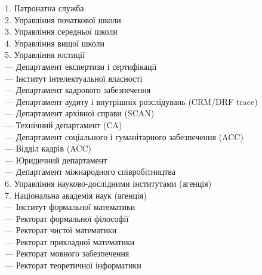 1. Патронатна служба \\
2. Управління початкової школи \\
3. Управління середньої школи \\
4. Управління вищої школи \\
5. Управління юстиції \\
\hspace{2cm}     — Департамент експертизи і сертифікації \\
\hspace{2cm}     — Інститут інтелектуальної власності \\
\hspace{2cm}     — Департамент кадрового забезпечення \\
\hspace{2cm}     — Департамент аудиту і внутрішніх розслідувань (CRM/DRF trace) \\
\hspace{2cm}     — Департамент архівної справи (SCAN) \\
\hspace{2cm}     — Технічний департамент (CA) \\
\hspace{2cm}     — Департамент соціального і гуманітарного забезпечення (ACC) \\
\hspace{2cm}     — Відділ кадрів (ACC) \\
\hspace{2cm}     — Юридичний департамент \\
\hspace{2cm}     — Департамент міжнародного співробітництва \\
6. Управління науково-дослідними інститутами (агенція) \\
7. Національна академія наук (агенція) \\
\hspace{2cm}     — Інститут формальної математики \\
\hspace{4cm}         — Ректорат формальної філософії \\
\hspace{4cm}         — Ректорат чистої математики \\
\hspace{4cm}         — Ректорат прикладної математики \\
\hspace{4cm}         — Ректорат мовного забезпечення \\
\hspace{4cm}         — Ректорат теоретичної інформатики \\
